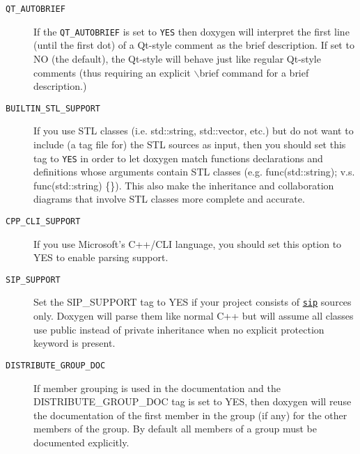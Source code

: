 \begin{description}
\label{config_cfg_qt_autobrief}
\hypertarget{config_cfg_qt_autobrief}{}
 \item[{\tt QT\_\-AUTOBRIEF} ] If the {\tt QT\_\-AUTOBRIEF} is set to {\tt YES} then doxygen will interpret the first line (until the first dot) of a Qt-style comment as the brief description. If set to NO (the default), the Qt-style will behave just like regular Qt-style comments (thus requiring an explicit $\backslash$brief command for a brief description.)

\label{config_cfg_builtin_stl_support}
\hypertarget{config_cfg_builtin_stl_support}{}
 \item[{\tt BUILTIN\_\-STL\_\-SUPPORT} ] If you use STL classes (i.e. std::string, std::vector, etc.) but do not want to include (a tag file for) the STL sources as input, then you should set this tag to {\tt YES} in order to let doxygen match functions declarations and definitions whose arguments contain STL classes (e.g. func(std::string); v.s. func(std::string) \{\}). This also make the inheritance and collaboration diagrams that involve STL classes more complete and accurate.

\label{config_cfg_cpp_cli_support}
\hypertarget{config_cfg_cpp_cli_support}{}
 \item[{\tt CPP\_\-CLI\_\-SUPPORT} ] If you use Microsoft's C++/CLI language, you should set this option to YES to enable parsing support.

\label{config_cfg_sip_support}
\hypertarget{config_cfg_sip_support}{}
 \item[{\tt SIP\_\-SUPPORT} ] Set the SIP\_\-SUPPORT tag to YES if your project consists of \href{http://www.riverbankcomputing.co.uk/sip/}{\tt sip} sources only. Doxygen will parse them like normal C++ but will assume all classes use public instead of private inheritance when no explicit protection keyword is present.

\label{config_cfg_distribute_group_doc}
\hypertarget{config_cfg_distribute_group_doc}{}
 \item[{\tt DISTRIBUTE\_\-GROUP\_\-DOC} ] If member grouping is used in the documentation and the DISTRIBUTE\_\-GROUP\_\-DOC tag is set to YES, then doxygen will reuse the documentation of the first member in the group (if any) for the other members of the group. By default all members of a group must be documented explicitly.


\end{description}
